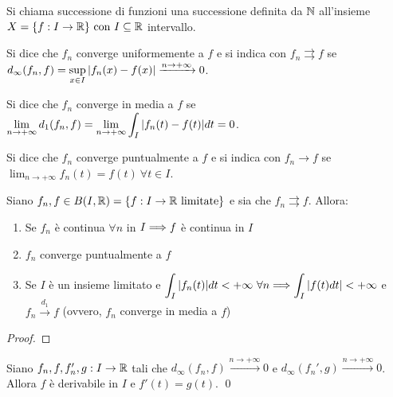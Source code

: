 \begin{definition}
    Si chiama successione di funzioni una successione definita da $\mathbb{N}$ all'insieme $X=\{f: I \to \mathbb{R}\} \text{ con } I \subseteq \mathbb{R}$ intervallo.
\end{definition}

\begin{definition}
    Si dice che $f_n$ converge uniformemente a $f$ e si indica con $f_n \rightrightarrows f$ se $d_\infty(f_n, f) = \sup\limits_{x \in I}\abs{f_n(x) - f(x)} \xrightarrow{n \to + \infty} 0$.
\end{definition}

\begin{definition}
    Si dice che $f_n$ converge in media a $f$ se $\displaystyle \lim_{n\to + \infty}d_1(f_n,f)=\lim_{n \to + \infty} \int_I\abs{f_n(t) - f(t)}dt = 0$.
\end{definition}

\begin{definition}
    Si dice che $f_n$ converge puntualmente a $f$ e si indica con $f_n \to f$ se $\displaystyle \lim_{n\to +\infty} f_n(t) = f(t) \ \forall t \in I$.
\end{definition}

\begin{theorem}
    Siano $f_n, f \in B(I, \mathbb{R}) = \{f: I \to \mathbb{R} \text{ limitate}\}$ e sia che $f_n \rightrightarrows f$. Allora:
    \begin{enumerate}
        \item Se $f_n$ è continua $\forall n$ in $I \Longrightarrow f$ è continua in $I$
        \item $f_n$ converge puntualmente a $f$
        \item Se $I$ è un insieme limitato e $\displaystyle \int_I\abs{f_n(t)}dt < + \infty \ \forall n \Longrightarrow \int_I\abs{f(t)dt} < +\infty$ e $f_n \xrightarrow{d_1} f$ (ovvero, $f_n$ converge in media a $f$)
    \end{enumerate}
\end{theorem}

\begin{proof}
    
\end{proof}

\begin{theorem}
    Siano $f_n, f, f_n', g: I \to \mathbb{R}$ tali che $d_\infty(f_n, f) \xrightarrow{n\to + \infty} 0$ e $d_\infty(f_n', g) \xrightarrow{n \to +\infty} 0$. Allora $f$ è derivabile in $I$ e $f'(t) = g(t)$. \qed
\end{theorem}